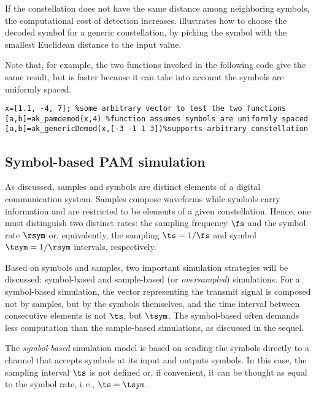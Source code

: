 If the constellation does not have the same distance among neighboring symbols, the computational cost of detection increases.  illustrates how to choose the decoded symbol for a generic constellation, by picking the symbol with the smallest Euclidean distance to the input value.


Note that, for example, the two functions invoked in the following code give the same result, but  is faster because it can take into account the symbols are uniformly spaced.
\begin{lstlisting}
x=[1.1, -4, 7]; %some arbitrary vector to test the two functions
[a,b]=ak_pamdemod(x,4) %function assumes symbols are uniformly spaced
[a,b]=ak_genericDemod(x,[-3 -1 1 3])%supports arbitrary constellation
\end{lstlisting}

\subsection{Symbol-based PAM simulation}
\label{sec:symbolVersusSample}

As discussed, samples and symbols are distinct elements of a digital communication system. Samples compose waveforms while symbols carry information and are restricted to be elements of a given constellation. Hence, one must distinguish two distinct rates: the sampling frequency $\fs$ and the symbol rate $\rsym$ or, equivalently, the sampling $\ts=1/\fs$ and symbol $\tsym=1/\rsym$ intervals, respectively.

Based on symbols and samples, two important simulation strategies will be discussed: symbol-based and sample-based (or \emph{oversampled}) simulations. For a symbol-based simulation, the vector representing the transmit signal is composed not by samples, but by the symbols themselves, and the time interval between consecutive elements is not $\ts$, but $\tsym$. The symbol-based often demands less computation than the sample-based simulations, as discussed in the sequel.

The \emph{symbol-based} simulation model is based on sending the symbols directly to a channel that accepts symbols at its input and outputs symbols. In this case, the sampling interval $\ts$ is not defined or, if convenient, it can be thought as equal to the symbol rate, i.\,e., $\ts = \tsym$.

